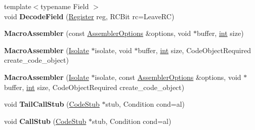 \begin{DoxyCompactItemize}
\item 
\mbox{\label{classv8_1_1internal_1_1MacroAssembler_a2a77f13e9420b16e4152fff890222025}} 
{\footnotesize template$<$typename Field $>$ }\\void {\bfseries Decode\+Field} (\mbox{\hyperlink{classv8_1_1internal_1_1Register}{Register}} reg, R\+C\+Bit rc=Leave\+RC)
\item 
\mbox{\label{classv8_1_1internal_1_1MacroAssembler_ab454c229ecab5061af905b7d5959c919}} 
{\bfseries Macro\+Assembler} (const \mbox{\hyperlink{structv8_1_1internal_1_1AssemblerOptions}{Assembler\+Options}} \&options, void $\ast$buffer, \mbox{\hyperlink{classint}{int}} size)
\item 
\mbox{\label{classv8_1_1internal_1_1MacroAssembler_ace8e2b09ca4bac1b40d12d84416284f9}} 
{\bfseries Macro\+Assembler} (\mbox{\hyperlink{classv8_1_1internal_1_1Isolate}{Isolate}} $\ast$isolate, void $\ast$buffer, \mbox{\hyperlink{classint}{int}} size, Code\+Object\+Required create\+\_\+code\+\_\+object)
\item 
\mbox{\label{classv8_1_1internal_1_1MacroAssembler_a118ab3d38490e9a50ee0157274ac3dc9}} 
{\bfseries Macro\+Assembler} (\mbox{\hyperlink{classv8_1_1internal_1_1Isolate}{Isolate}} $\ast$isolate, const \mbox{\hyperlink{structv8_1_1internal_1_1AssemblerOptions}{Assembler\+Options}} \&options, void $\ast$buffer, \mbox{\hyperlink{classint}{int}} size, Code\+Object\+Required create\+\_\+code\+\_\+object)
\item 
\mbox{\label{classv8_1_1internal_1_1MacroAssembler_a2e979aa8359c6965ff35ab75551e4e9c}} 
void {\bfseries Tail\+Call\+Stub} (\mbox{\hyperlink{classv8_1_1internal_1_1CodeStub}{Code\+Stub}} $\ast$stub, Condition cond=al)
\item 
\mbox{\label{classv8_1_1internal_1_1MacroAssembler_a7d21a7004bdf85665462d7dcc8216376}} 
void {\bfseries Call\+Stub} (\mbox{\hyperlink{classv8_1_1internal_1_1CodeStub}{Code\+Stub}} $\ast$stub, Condition cond=al)
\item 
\mbox{\label{classv8_1_1internal_1_1MacroAssembler_a37081c297a4c533e549cc58167f7ccaa}} 

\end{DoxyCompactItemize}
